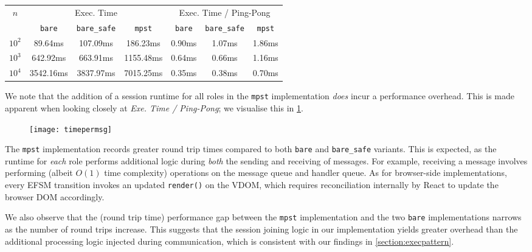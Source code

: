 \renewcommand{\arraystretch}{1.5}
\begin{table}[!ht]
\centering
\begin{tabular}{||c||c|c|c||c|c|c||}
\hline
\multirow{2}{*}{$n$} & 
\multicolumn{3}{c||}{Exec. Time} & 
\multicolumn{3}{c||}{Exec. Time / Ping-Pong} \\
\cline{2-7}
 & \texttt{bare} & \texttt{bare_safe} & \texttt{mpst} 
 & \texttt{bare} & \texttt{bare_safe} & \texttt{mpst} \\
\hline\hline
$10^2$ & 89.64ms & 107.09ms & 186.23ms & 0.90ms & 1.07ms & 1.86ms \\
$10^3$ & 642.92ms & 663.91ms & 1155.48ms & 0.64ms & 0.66ms & 1.16ms \\
$10^4$ & 3542.16ms & 3837.97ms & 7015.25ms & 0.35ms & 0.38ms & 0.70ms \\
\hline
\end{tabular}
\label{table:overhead}
\end{table}
\renewcommand{\arraystretch}{1}

We note that the addition of a session runtime for all roles in the 
\texttt{mpst} implementation \textit{does} incur a performance overhead. 
This is made apparent when looking closely at 
\textit{Exe. Time / Ping-Pong};
we visualise this in \cref{fig:timepermsg}.

\begin{figure}[!ht]
\centering
\texttt{[image: timepermsg]}
\label{fig:timepermsg}
\end{figure}

The \texttt{mpst} implementation records greater round trip times compared
to both \texttt{bare} and \texttt{bare_safe} variants. This is expected,
as the runtime for \textit{each} role performs additional logic during
\textit{both} the sending and receiving of messages. 
For example, receiving a message involves performing
(albeit $O(1)$ time complexity) operations on the message queue and
handler queue. As for browser-side implementations, every EFSM transition
invokes an updated \texttt{render()} on the VDOM, which requires
reconciliation internally by React to update the browser DOM accordingly.

We also observe that the (round trip time) performance gap between 
the \texttt{mpst} implementation and the two 
\texttt{bare} implementations narrows as the number of round trips 
increase. This suggests that the session joining logic in our
implementation yields greater overhead than the additional processing
logic injected during communication, which is consistent with 
our findings in \cref{section:execpattern}.

